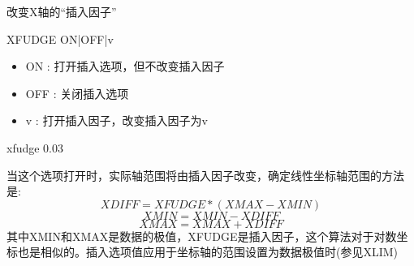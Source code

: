 \label{cmd:xfudge}

改变X轴的``插入因子''

\begin{SACSTX}
XFUDGE ON|OFF|v
\end{SACSTX}

\begin{itemize}
\item ON : 打开插入选项，但不改变插入因子 
\item OFF : 关闭插入选项 
\item v : 打开插入因子，改变插入因子为v 
\end{itemize}

\begin{SACDFT}
xfudge 0.03
\end{SACDFT}

当这个选项打开时，实际轴范围将由插入因子改变，确定线性坐标轴范围的方法是:
\[ XDIFF=XFUDGE*(XMAX-XMIN) \]
\[ XMIN=XMIN-XDIFF \]
\[ XMAX=XMAX+XDIFF \]
其中XMIN和XMAX是数据的极值，XFUDGE是插入因子，这个算法对于对数坐标也是相似的。插入选项值应用于坐标轴的范围设置为数据极值时(参见XLIM)

